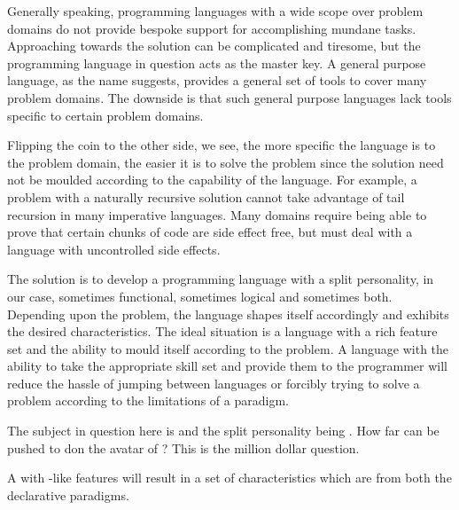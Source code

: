 \documentclass[thesis-solanki.tex]{subfiles}
\begin{document}
Generally speaking, programming languages with a wide scope over problem domains do not provide bespoke support for
accomplishing  mundane tasks.
Approaching towards the solution can be complicated and tiresome, but the programming language in question acts as
the master key.
A general purpose language, as the name suggests, provides a general set of tools to cover many problem domains.
The downside is that such general purpose languages lack tools specific to certain problem domains.

Flipping the coin to the other side, we see, the more specific the language is to the problem domain, the easier it
is to solve the problem since the solution need not be moulded according to the capability  of the language.
For example, a problem with a naturally recursive solution cannot take advantage of tail recursion in many
imperative languages.
Many domains require being able to prove that certain chunks of code are side effect free, but must deal with a 
language with uncontrolled side effects.


The solution is to develop a programming language with a split personality, in our case, sometimes functional,
sometimes logical and sometimes both.
Depending upon the problem, the language shapes itself accordingly and exhibits the desired characteristics.
The ideal situation is a language with a rich feature set and the ability to mould itself according to the problem.
A language with the ability to take the appropriate skill set and provide them to the programmer will reduce the
hassle of jumping between languages or forcibly trying to solve a problem according to the limitations of a
paradigm.

The subject in question here is  and the split personality being .
How far can  be pushed to don the avatar of ?
This is the million dollar question.

A  with -like features will result in a set of characteristics which are from
both the declarative paradigms.
\end{document}
